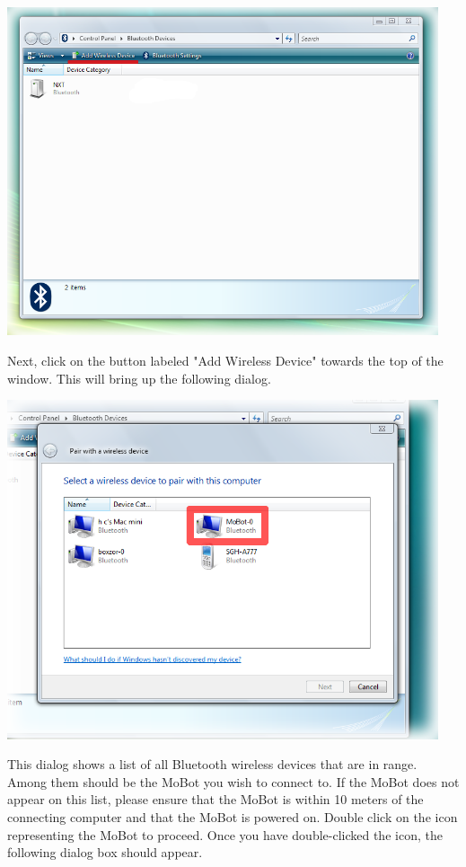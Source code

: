 \documentclass{article}
\begin{document}
\begin{center}
\includegraphics[width=5in]{images/imobot_connect_1a.png}
\end{center}

Next, click on the
button labeled "Add Wireless Device" towards the top of the window. This 
will bring up the following dialog.

\begin{center}
\includegraphics[width=5in]{images/imobot_connect_2.png}
\end{center}

This dialog shows a list of all Bluetooth wireless devices that are in range.
Among them should be the MoBot you wish to connect to. If the MoBot does not
appear on this list, please ensure that the MoBot is within 10 meters of the
connecting computer and that the MoBot is powered on. Double click on the icon
representing the MoBot to proceed. Once you have double-clicked the icon, the
following dialog box should appear.
\end{document}
